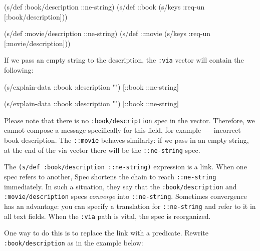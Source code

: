 \else

\begin{english}
  \begin{clojure}
(s/def :book/description ::ne-string)
(s/def ::book (s/keys :req-un [:book/description]))

(s/def :movie/description ::ne-string)
(s/def ::movie (s/keys :req-un [:movie/description]))
  \end{clojure}
\end{english}

\fi

If we pass an empty string to the description, the \verb|:via| vector will contain the following:

\ifx\DEVICETYPE\MOBILE

\begin{english}
  \begin{clojure}
(s/explain-data ::book
  {:description ""})
[::book ::ne-string]
  \end{clojure}
\end{english}

\else

\begin{english}
  \begin{clojure}
(s/explain-data ::book {:description ""})
[::book ::ne-string]
  \end{clojure}
\end{english}

\fi

Please note that there is no \texttt{:book/de\-scription} spec in the vector. Therefore, we cannot compose a message specifically for this field, for example~--- incorrect book description. The \verb|::movie| behaves similarly: if we pass in an empty string, at the end of the via vector there will be the \verb|::ne-string| spec.

\mnoindent
The \texttt{(s/def :book/description ::ne\--string)} expression is a link. When one spec refers to another, Spec shortens the chain to reach \verb|::ne-string| immediately. In such a situation, they say that the \verb|:book/description| and \verb|:movie/description| specs \emph{converge} into \verb|::ne-string|. Sometimes convergence has an advantage: you can specify a translation for \verb|::ne-string| and refer to it in all text fields. When the \verb|:via| path is vital, the spec is reorganized.

\mnoindent
One way to do this is to replace the link with a predicate. Rewrite \verb|:book/description| as in the example below:

